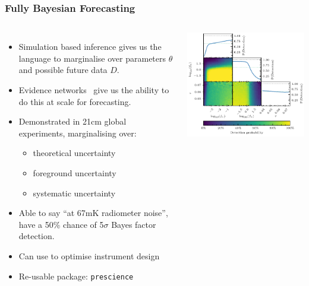\documentclass[aspectratio=169]{beamer}
\begin{document}
\begin{frame}
    \frametitle{Fully Bayesian Forecasting~}
    \begin{columns}
        \begin{itemize}
            \item Simulation based inference gives us the language to marginalise over parameters $\theta$ and possible future data $D$.
            \item Evidence networks~ give us the ability to do this at scale for forecasting.
            \item Demonstrated in 21cm global experiments, marginalising over:
                \begin{itemize}
                    \item theoretical uncertainty
                    \item foreground uncertainty
                    \item systematic uncertainty
                \end{itemize}
            \item Able to say ``at 67mK radiometer noise'', have a 50\% chance of 5$\sigma$ Bayes factor detection.
            \item Can use to optimise instrument design
            \item Re-usable package: \texttt{prescience}
        \end{itemize}
        \includegraphics[width=\textwidth]{figures/fbf.pdf}
    \end{columns}
\end{frame}
\end{document}
